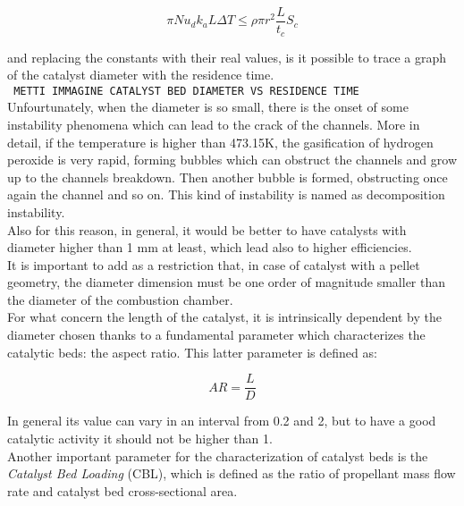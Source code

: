 \documentclass[a4paper]{report}
\begin{document}
\begin{equation}
\pi Nu_dk_aL\Delta T \leq \rho\pi r^2 \frac{L}{t_c}S_c
\end{equation}

and replacing the constants with their real values, is it possible to trace a graph of the catalyst diameter with the residence time. \\

\texttt{\color{red} METTI IMMAGINE CATALYST BED DIAMETER VS RESIDENCE TIME}\\

Unfourtunately, when the diameter is so small, there is the onset of some instability phenomena which can lead to the crack of the channels. More in detail, if the temperature is higher than 473.15K, the gasification of hydrogen peroxide is very rapid, forming bubbles which can obstruct the channels and grow up to the channels breakdown. Then another bubble is formed, obstructing once again the channel and so on. This kind of instability is named as decomposition instability.\\ %
Also for this reason, in general, it would be better to have catalysts with diameter higher than 1 mm at least, which lead also to higher efficiencies.\\ It is important to add as a restriction that, in case of catalyst with a pellet geometry, the diameter dimension must be one order of magnitude smaller than the diameter of the combustion chamber.\\
For what concern the length of the catalyst, it is intrinsically dependent by the diameter chosen thanks to a fundamental parameter which characterizes the catalytic beds: the aspect ratio. This latter parameter is defined as: 

\begin{equation}
AR=\frac{L}{D}
\end{equation}

In general its value can vary in an interval from 0.2 and 2, but to have a good catalytic activity it should not be higher than 1. \\ %
Another important parameter for the characterization of catalyst beds is the \textit{Catalyst Bed Loading} (CBL), which is defined as the ratio of propellant mass flow rate and catalyst bed cross-sectional area.\\
\end{document}
